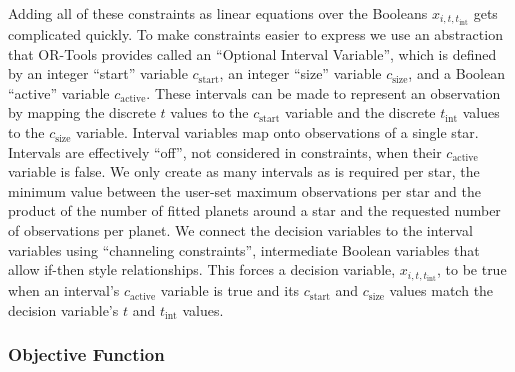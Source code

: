 Adding all of these constraints as linear equations over the Booleans $x_{i, t,
t_{\textrm{int}}}$ gets complicated quickly. To make constraints easier to
express we use an abstraction that OR-Tools provides called an ``Optional
Interval Variable'', which is defined by an integer ``start'' variable
$c_\textrm{start}$, an integer ``size'' variable $c_\textrm{size}$, and a Boolean
``active'' variable $c_\textrm{active}$. These intervals can be made to represent
an observation by mapping the discrete $t$ values to the $c_\textrm{start}$
variable and the discrete $t_\textrm{int}$ values to the $c_\textrm{size}$
variable. Interval variables map onto observations of a single star. Intervals
are effectively ``off'', not considered in constraints, when their
$c_\textrm{active}$ variable is false. We only create as many intervals as is
required per star, the minimum value between the user-set maximum observations
per star and the product of the number of fitted planets around a star and the
requested number of observations per planet. We connect the decision variables
to the interval variables using ``channeling constraints'', intermediate Boolean
variables that allow if-then style relationships. This forces a decision
variable, $x_{i, t, t_{\textrm{int}}}$, to be true when an interval's
$c_\textrm{active}$ variable is true and its $c_\textrm{start}$ and
$c_\textrm{size}$ values match the decision variable's $t$ and $t_\textrm{int}$
values.

\subsubsection{Objective Function}

